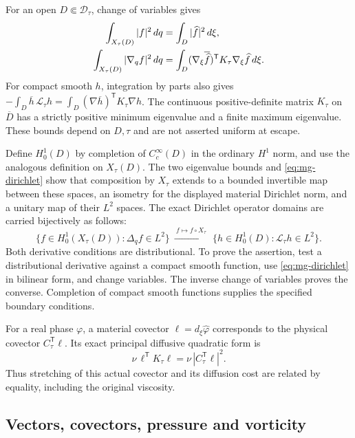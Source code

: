 For an open $D\Subset\mathcal D_\tau$, change of variables gives
\begin{align}
 \int_{X_\tau(D)}|f|^2\,dq&=\int_D|\widehat f|^2\,d\xi,\notag\\
 \int_{X_\tau(D)}|\nabla_q f|^2\,dq
 &=\int_D(\nabla_\xi\overline{\widehat f})^{\mathsf T}
                       K_\tau\nabla_\xi\widehat f\,d\xi .
 \label{eq:mg-dirichlet}
\end{align}
For compact smooth $h$, integration by parts also gives
$-\int_D\overline h\,\mathcal L_\tau h
=\int_D(\nabla\overline h)^{\mathsf T}K_\tau\nabla h$.
The continuous positive-definite matrix $K_\tau$ on $\overline D$
has a strictly positive minimum eigenvalue and a finite maximum eigenvalue.
These bounds depend on $D,\tau$ and are not asserted uniform at escape.

Define $H^1_0(D)$ by completion of $C_c^\infty(D)$ in the ordinary
$H^1$ norm, and use the analogous definition on $X_\tau(D)$.
The two eigenvalue bounds and \eqref{eq:mg-dirichlet} show that
composition by $X_\tau$ extends to a bounded invertible map between
these spaces, an isometry for the displayed material Dirichlet norm,
and a unitary map of their $L^2$ spaces. The exact Dirichlet operator
domains are carried bijectively as follows:
\[
 \{f\in H^1_0(X_\tau(D)):\Delta_qf\in L^2\}
 \ \xrightarrow{\ f\mapsto f\circ X_\tau\ }\
 \{h\in H^1_0(D):\mathcal L_\tau h\in L^2\}.
\]
Both derivative conditions are distributional. To prove the assertion,
test a distributional derivative against a compact smooth function,
use \eqref{eq:mg-dirichlet} in bilinear form, and change variables.
The inverse change of variables proves the converse. Completion of
compact smooth functions supplies the specified boundary conditions.

For a real phase $\varphi$, a material covector $\ell=d_\xi\widehat\varphi$
corresponds to the physical covector $C_\tau^{\mathsf T}\ell$.
Its exact principal diffusive quadratic form is
\begin{equation}\label{eq:mg-symbol}
 \nu\,\ell^{\mathsf T}K_\tau\ell
       =\nu\,|C_\tau^{\mathsf T}\ell|^2.
\end{equation}
Thus stretching of this actual covector and its diffusion cost are
related by equality, including the original viscosity.

\subsection{Vectors, covectors, pressure and vorticity}

